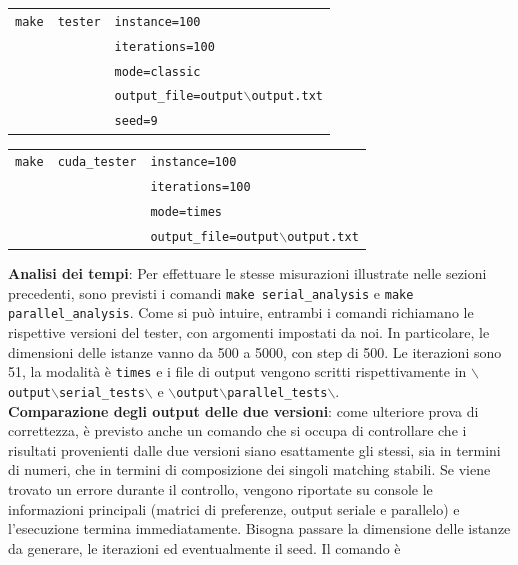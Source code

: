 \documentclass[12pt]{article}
\begin{document}
    \begin{table}[h]
    \begin{tabular}{lll}
        \texttt{make} & \texttt{tester} & \texttt{instance=100} \\ 
        & & \texttt{iterations=100} \\
        & & \texttt{mode=classic} \\
        & & \texttt{output\_file=output$\backslash$output.txt} \\
        & & \texttt{seed=9}
        \end{tabular}
    \end{table}

    \begin{table}[h]
    \begin{tabular}{lll}
        \texttt{make} & \texttt{cuda\_tester} & \texttt{instance=100} \\ 
        & & \texttt{iterations=100} \\
        & & \texttt{mode=times} \\
        & & \texttt{output\_file=output$\backslash$output.txt} \\
        \end{tabular}
    \end{table}

    \textbf{Analisi dei tempi}: Per effettuare le stesse misurazioni illustrate nelle sezioni precedenti, sono previsti i comandi \texttt{make serial\_analysis} e \texttt{make parallel\_analysis}. Come si può intuire, entrambi i comandi richiamano le rispettive versioni del tester, con argomenti impostati da noi. In particolare, le dimensioni delle istanze vanno da 500 a 5000, con step di 500. Le iterazioni sono 51, la modalità è \texttt{times} e i file di output vengono scritti rispettivamente in \texttt{$\backslash$output$\backslash$serial\_tests$\backslash$} e \texttt{$\backslash$output$\backslash$parallel\_tests$\backslash$}. \\

    \textbf{Comparazione degli output delle due versioni}: come ulteriore prova di correttezza, è previsto anche un comando che si occupa di controllare che i risultati provenienti dalle due versioni siano esattamente gli stessi, sia in termini di numeri, che in termini di composizione dei singoli matching stabili. Se viene trovato un errore durante il controllo, vengono riportate su console le informazioni principali (matrici di preferenze, output seriale e parallelo) e l'esecuzione termina immediatamente. Bisogna passare la dimensione delle istanze da generare, le iterazioni ed eventualmente il seed. Il comando è 
\end{document}
